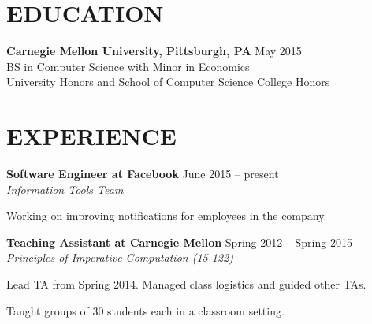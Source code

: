\documentclass[margin, 11pt]{res} %
\begin{document}
\begin{resume}


\section{EDUCATION}

{\bf Carnegie Mellon University, Pittsburgh, PA} \hfill {\small May 2015}\\
{\small BS in Computer Science with Minor in Economics} \\
{\small University Honors and School of Computer Science College Honors}



\section{EXPERIENCE}

{\bf Software Engineer at Facebook} \hfill {\small June 2015 -- present}\\
{\small {\sl Information Tools Team}}
\begin{itemize} \itemsep -2pt
{\small \item Working on improving notifications for employees in the company.}
\end{itemize}
\vspace{3pt}

{\bf Teaching Assistant at Carnegie Mellon} \hfill {\small Spring 2012 -- Spring 2015}\\
{\small {\sl Principles of Imperative Computation (15-122)}}

\begin{itemize} \itemsep -2pt
{\small \item Lead TA from Spring 2014. Managed class logistics and guided other TAs.
\item Taught groups of 30 students each in a classroom setting.}
\end{itemize}


\end{resume}
\end{document}
